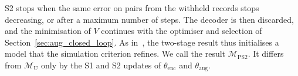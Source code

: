 S2 stops when the same error on pairs from the withheld records stops
decreasing, or after a maximum number of steps.
The decoder is then discarded, and the minimisation of $V$ continues with the
optimiser and selection of Section~\ref{sec:aug_closed_loop}.
As in~\cite[Sec.~4.2]{downey2017psrnn}, the two-stage result thus initialises
a model that the simulation criterion refines.
We call the result $\mathcal M_{\mathrm{PS2}}$.
It differs from $\mathcal M_{\mathrm U}$ only by the S1 and S2 updates of
$\theta_{\mathrm{enc}}$ and $\theta_{\mathrm{aug}}$.
